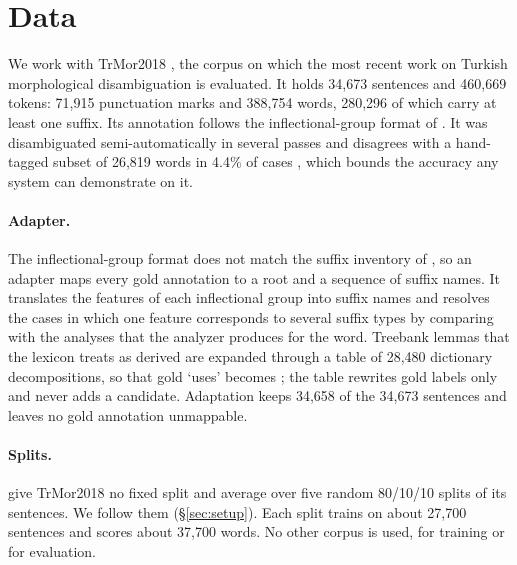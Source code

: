\section{Data}
\label{sec:data}

We work with TrMor2018 \citep{akyurek-etal-2019-morphological}, the corpus on which the most recent work on Turkish morphological disambiguation is evaluated. It holds 34,673 sentences and 460,669 tokens: 71,915 punctuation marks and 388,754 words, 280,296 of which carry at least one suffix. Its annotation follows the inflectional-group format of \citet{oflazer-1994-two}. It was disambiguated semi-automatically in several passes and disagrees with a hand-tagged subset of 26,819 words in 4.4\% of cases \citep{akyurek-etal-2019-morphological}, which bounds the accuracy any system can demonstrate on it.

\paragraph{Adapter.}
The inflectional-group format does not match the suffix inventory of \savyar{}, so an adapter maps every gold annotation to a root and a sequence of \savyar{} suffix names. It translates the features of each inflectional group into suffix names and resolves the cases in which one feature corresponds to several suffix types by comparing with the analyses that the analyzer produces for the word. Treebank lemmas that the lexicon treats as derived are expanded through a table of 28,480 dictionary decompositions, so that gold  `uses' becomes ; the table rewrites gold labels only and never adds a candidate. Adaptation keeps 34,658 of the 34,673 sentences and leaves no gold annotation unmappable.

\paragraph{Splits.}
\citet{akyurek-etal-2019-morphological} give TrMor2018 no fixed split and average over five random 80/10/10 splits of its sentences. We follow them (\S\ref{sec:setup}). Each split trains on about 27,700 sentences and scores about 37,700 words. No other corpus is used, for training or for evaluation.
